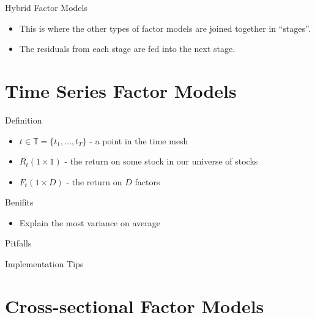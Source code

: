 \begin{frame}{Hybrid Factor Models}

\begin{itemize}
\itemsep1pt\parskip0pt
\item
  This is where the other types of factor models are joined together in
  ``stages''.
\item
  The residuals from each stage are fed into the next stage.
\end{itemize}

\end{frame}

\section{Time Series Factor Models}\label{time-series-factor-models-1}

\begin{frame}{Definition}

\begin{itemize}
\itemsep1pt\parskip0pt
\item
  $t \in \mathbb{T} = \{ t_1, \ldots, t_T \}$ - a point in the time mesh
\item
  $R_t (1 \times 1)$ - the return on some stock in our universe of
  stocks
\item
  $F_t (1 \times D)$ - the return on $D$ factors
\end{itemize}

\end{frame}

\begin{frame}{Benifits}

\begin{itemize}
\itemsep1pt\parskip0pt
\item
  Explain the most variance on average
\end{itemize}

\end{frame}

\begin{frame}{Pitfalls}

\end{frame}

\begin{frame}{Implementation Tips}

\end{frame}

\section{Cross-sectional Factor
Models}\label{cross-sectional-factor-models-1}

